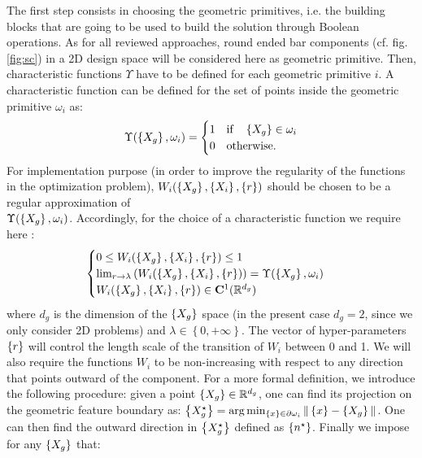 The first step consists in choosing the geometric primitives, i.e. the building blocks that are going to be used to build the solution through Boolean operations. As for all reviewed approaches, round ended bar components (cf. fig. \ref{fig:sc}) in a 2D design space will be considered here as geometric primitive. Then, characteristic functions $\Upsilon$ have to be defined for each geometric primitive $i$. A characteristic function can be defined for the set of points inside the geometric primitive $\omega_i$ as:
  \begin{equation}
  \Upsilon(\left\{{X_g}\right\},\omega_i)=\begin{cases}
        1 & \text{if} \quad \left\{{X_g}\right\}\in \omega_i \\
        0 & \text{otherwise}.
        \end{cases}
 \end{equation}
 For implementation purpose  (in order to improve the regularity of the functions in the optimization problem), $W_i(\left\{{X_g}\right\},\left\{{X_i}\right\},\left\{{r}\right\})$ should be chosen to be a regular approximation of\\ $\Upsilon(\left\{{X_g}\right\},\omega_i)$.
 Accordingly, for the choice of a characteristic function we require here :
 \begin{equation}
\begin{cases}
     0\leq W_i(\left\{{X_g}\right\},\left\{{X_i}\right\},\left\{{r}\right\})\leq 1\\
     \lim_{r\to\lambda}\left(W_i(\left\{{X_g}\right\},\left\{{X_i}\right\},\left\{{r}\right\})\right)= \Upsilon(\left\{{X_g}\right\},\omega_i)\\
      W_i(\left\{{X_g}\right\},\left\{{X_i}\right\},\left\{{r}\right\})\in \mathbf{C}^{1}(\mathbb{R}^{d_g}) \\
     \end{cases}
 \end{equation}
 where $d_g$ is the dimension of the $\left\{{X_g}\right\}$ space (in the present case $d_g=2$, since we only consider 2D problems) and  $\lambda\in\left\lbrace0,+\infty\right\rbrace$.
 The vector of hyper-parameters $\left\{{r}\right\}$ will control the length scale of the transition of  $W_i$ between 0 and 1.  We will also require the functions $W_i$ to be non-increasing with respect to any direction that points outward of the component. For a more formal definition, we introduce the following procedure: given a point $\left\{{X_g}\right\}\in \mathbb{R}^{d_g}$, one can find its projection on the geometric feature boundary as: $\left\{{{X}^\star_g}\right\}=\arg \min_{\left\{{x}\right\}\in \partial \omega_i} \|\left\{{x}\right\}-\left\{{X_g}\right\}\| $.
 One can then find the outward direction in $\left\{{{X}^\star_g}\right\}$ defined as $\left\{{n^\star}\right\}$. Finally we impose for any $\left\{{X_g}\right\}$ that:
